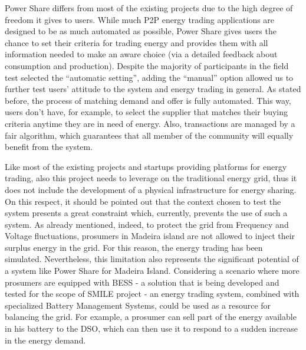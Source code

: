 Power Share differs from most of the existing projects due to the high degree of freedom it gives to users. While much P2P energy trading applications are designed to be as much automated as possible, Power Share gives users the chance to set their criteria for trading energy and provides them with all information needed to make an aware choice (via a detailed feedback about consumption and production). Despite the majority of participants in the field test selected the “automatic setting”, adding the “manual” option allowed us to further test users’ attitude to the system and energy trading in general.
As stated before, the process of matching demand and offer is fully automated. This way, users don’t have, for example, to select the supplier that matches their buying criteria anytime they are in need of energy. Also, transactions are managed by a fair algorithm, which guarantees that all member of the community will equally benefit from the system. 



Like most of the existing projects and startups providing platforms for energy trading, also this project needs to leverage on the traditional energy grid, thus it does not include the development of a physical infrastructure for energy sharing. On this respect, it should be pointed out that the context chosen to test the system presents a great constraint which, currently, prevents the use of such a system. As already mentioned, indeed, to protect the grid from Frequency and Voltage fluctuations, prosumers in Madeira island are not allowed to inject their surplus energy in the grid. For this reason, the energy trading has been simulated. Nevertheless, this limitation also represents the significant potential of a system like Power Share for Madeira Island. Considering a scenario where more prosumers are equipped with BESS - a solution that is being developed and tested for the scope of SMILE project - an energy trading system, combined with specialized Battery Management Systems, could be used as a resource for balancing the grid. For example, a prosumer can sell part of the energy available in his battery to the \ac{DSO}, which can then use it to respond to a sudden increase in the energy demand.


